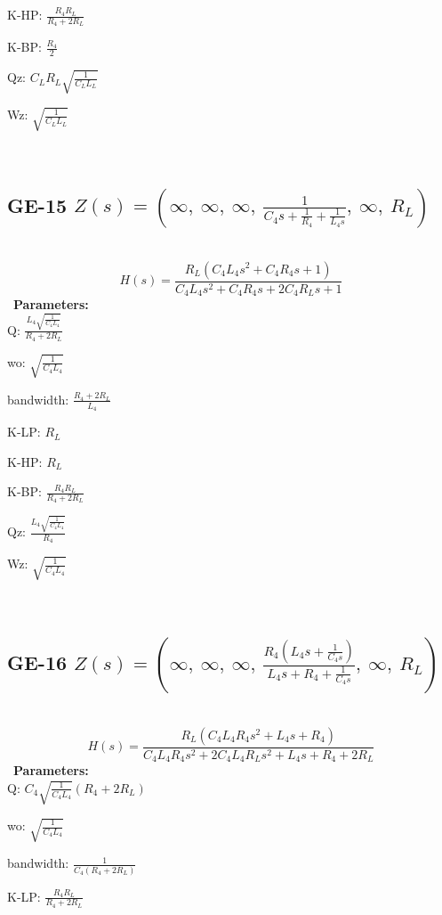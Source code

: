 \documentclass{article}
\begin{document}
K-HP: $\frac{R_{4} R_{L}}{R_{4} + 2 R_{L}}$\ 

K-BP: $\frac{R_{4}}{2}$\ 

Qz: $C_{L} R_{L} \sqrt{\frac{1}{C_{L} L_{L}}}$\ 

Wz: $\sqrt{\frac{1}{C_{L} L_{L}}}$\ 

\ 

\subsection{GE-15 $Z(s) = \left( \infty, \  \infty, \  \infty, \  \frac{1}{C_{4} s + \frac{1}{R_{4}} + \frac{1}{L_{4} s}}, \  \infty, \  R_{L}\right)$ } \ 
\textbf{\[H(s) = \frac{R_{L} \left(C_{4} L_{4} s^{2} + C_{4} R_{4} s + 1\right)}{C_{4} L_{4} s^{2} + C_{4} R_{4} s + 2 C_{4} R_{L} s + 1}\] } \ 
\textbf{Parameters:}\\ 

Q: $\frac{L_{4} \sqrt{\frac{1}{C_{4} L_{4}}}}{R_{4} + 2 R_{L}}$\ 

wo: $\sqrt{\frac{1}{C_{4} L_{4}}}$\ 

bandwidth: $\frac{R_{4} + 2 R_{L}}{L_{4}}$\ 

K-LP: $R_{L}$\ 

K-HP: $R_{L}$\ 

K-BP: $\frac{R_{4} R_{L}}{R_{4} + 2 R_{L}}$\ 

Qz: $\frac{L_{4} \sqrt{\frac{1}{C_{4} L_{4}}}}{R_{4}}$\ 

Wz: $\sqrt{\frac{1}{C_{4} L_{4}}}$\ 

\ 

\subsection{GE-16 $Z(s) = \left( \infty, \  \infty, \  \infty, \  \frac{R_{4} \left(L_{4} s + \frac{1}{C_{4} s}\right)}{L_{4} s + R_{4} + \frac{1}{C_{4} s}}, \  \infty, \  R_{L}\right)$ } \ 
\textbf{\[H(s) = \frac{R_{L} \left(C_{4} L_{4} R_{4} s^{2} + L_{4} s + R_{4}\right)}{C_{4} L_{4} R_{4} s^{2} + 2 C_{4} L_{4} R_{L} s^{2} + L_{4} s + R_{4} + 2 R_{L}}\] } \ 
\textbf{Parameters:}\\ 

Q: $C_{4} \sqrt{\frac{1}{C_{4} L_{4}}} \left(R_{4} + 2 R_{L}\right)$\ 

wo: $\sqrt{\frac{1}{C_{4} L_{4}}}$\ 

bandwidth: $\frac{1}{C_{4} \left(R_{4} + 2 R_{L}\right)}$\ 

K-LP: $\frac{R_{4} R_{L}}{R_{4} + 2 R_{L}}$\ 
\end{document}
